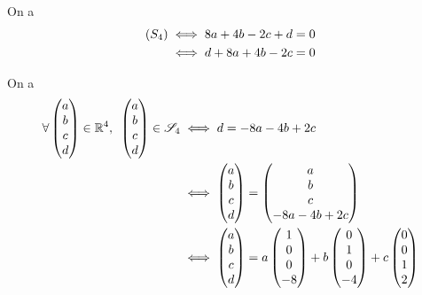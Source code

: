 \begin{corr}[4]
On a \[\begin{aligned}
\left(S_4\right)&\iff8a+4b-2c+d=0 \\
&\iff d+8a+4b-2c=0
\end{aligned}\]

On a \[\begin{aligned}
\quantifs{\forall\begin{pmatrix}a\\b\\c\\d\end{pmatrix}\in\R^4}\begin{pmatrix}a\\b\\c\\d\end{pmatrix}\in\fami{S}_4&\ssi d=-8a-4b+2c \\
&\ssi\begin{pmatrix}a\\b\\c\\d\end{pmatrix}=\begin{pmatrix}a\\b\\c\\-8a-4b+2c\end{pmatrix} \\
&\ssi\begin{pmatrix}a\\b\\c\\d\end{pmatrix}=a\begin{pmatrix}1\\0\\0\\-8\end{pmatrix}+b\begin{pmatrix}0\\1\\0\\-4\end{pmatrix}+c\begin{pmatrix}0\\0\\1\\2\end{pmatrix}
\end{aligned}\]


\end{corr}
